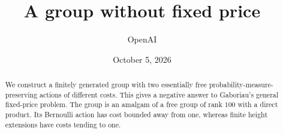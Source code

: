 \documentclass[11pt]{article}
\title{A group without fixed price}
\author{OpenAI}
\date{October 5, 2026}
\theoremstyle{remark}
\begin{document}
\maketitle
\begin{abstract}
We construct a finitely generated group with two essentially free
probability-measure-preserving actions of different costs. This gives
a negative answer to Gaboriau's general fixed-price problem. The group is an
amalgam of a free group of rank $100$ with a direct product. Its
Bernoulli action has cost bounded away from one, whereas finite height
extensions have costs tending to one.
\end{abstract}
\tableofcontents








\clearpage


\end{document}
